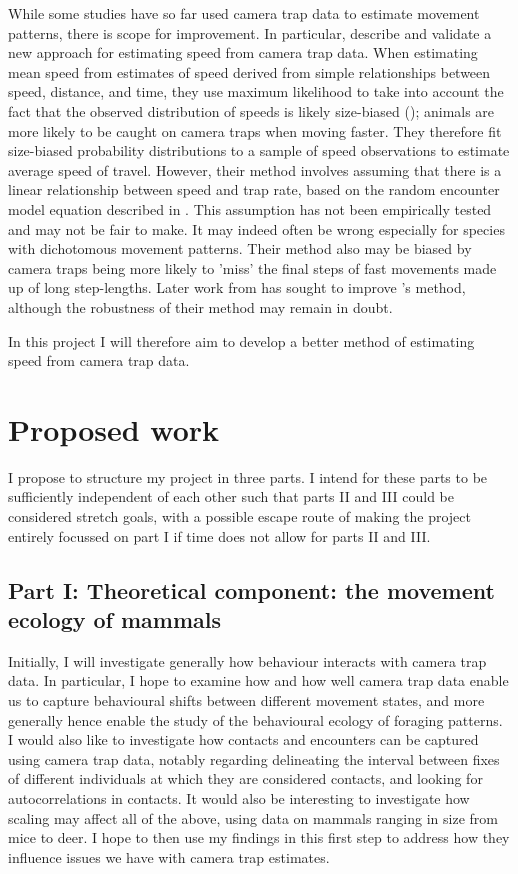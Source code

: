 \documentclass[11pt]{article}
\begin{document}
	While some studies have so far used camera trap data to estimate movement patterns, there is scope for improvement. In particular, \cite{rowcliffe2016wildlife} describe and validate a new approach for estimating speed from camera trap data. When estimating mean speed from estimates of speed derived from simple relationships between speed, distance, and time, they use maximum likelihood to take into account the fact that the observed distribution of speeds is likely size-biased (\cite{patil2006weighted}); animals are more likely to be caught on camera traps when moving faster. They therefore fit size-biased probability distributions to a sample of speed observations to estimate average speed of travel. However, their method involves assuming that there is a linear relationship between speed and trap rate, based on the random encounter model equation described in \cite{rowcliffe2008estimating}. This assumption has not been empirically tested and may not be fair to make. It may indeed often be wrong especially for species with dichotomous movement patterns. Their method also may be biased by camera traps being more likely to 'miss' the final steps of fast movements made up of long step-lengths. Later work from \cite{palencia2021innovations} has sought to improve \cite{rowcliffe2016wildlife}'s method, although the robustness of their method may remain in doubt.
	
	In this project I will therefore aim to develop a better method of estimating speed from camera trap data.
	
	\newpage
	\section{Proposed work}
	
	I propose to structure my project in three parts. I intend for these parts to be sufficiently independent of each other such that parts II and III could be considered stretch goals, with a possible escape route of making the project entirely focussed on part I if time does not allow for parts II and III.
	
	
	\subsection{Part I: Theoretical component: the movement ecology of mammals}
	
	Initially, I will investigate generally how behaviour interacts with camera trap data. In particular, I hope to examine how and how well camera trap data enable us to capture behavioural shifts between different movement states, and more generally hence enable the study of the behavioural ecology of foraging patterns. I would also like to investigate how contacts and encounters can be captured using camera trap data, notably regarding delineating the interval between fixes of different individuals at which they are considered contacts, and looking for autocorrelations in contacts. It would also be interesting to investigate how scaling may affect all of the above, using data on mammals ranging in size from mice to deer. 
	I hope to then use my findings in this first step to address how they influence issues we have with camera trap estimates.
	
\end{document}

